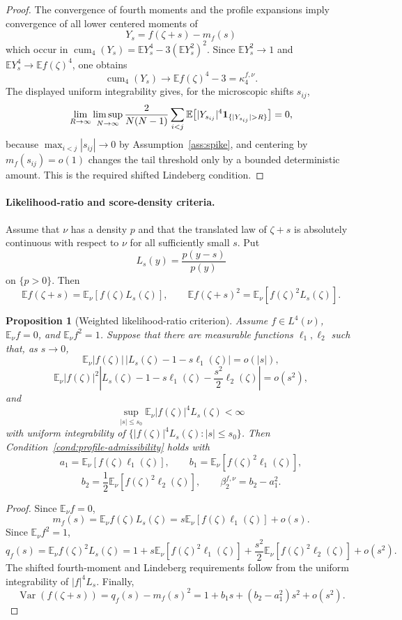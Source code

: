 \documentclass[11pt]{article}
\newtheorem{proposition}[theorem]{Proposition}
\theoremstyle{definition}
\theoremstyle{remark}
\newcommand{\E}{\mathbb E}
\newcommand{\Var}{\operatorname{Var}}
\newcommand{\cum}{\operatorname{cum}}
\begin{document}
\begin{proof}
The convergence of fourth moments and the profile expansions imply convergence of all lower centered moments of
\[
        Y_s=f(\zeta+s)-m_f(s)
\]
which occur in \(\cum_4(Y_s)=\E Y_s^4-3(\E Y_s^2)^2\).  Since \(\E Y_s^2\to1\) and \(\E Y_s^4\to\E f(\zeta)^4\), one obtains
\[
        \cum_4(Y_s)\to \E f(\zeta)^4-3=\kappa_4^{f,\nu}.
\]
The displayed uniform integrability gives, for the microscopic shifts \(s_{ij}\),
\[
\lim_{R\to\infty}\limsup_{N\to\infty}
\frac{2}{N(N-1)}\sum_{i<j}
\E\bigl[|Y_{s_{ij}}|^4{\bf 1}_{\{|Y_{s_{ij}}|>R\}}\bigr]=0,
\]
because \(\max_{i<j}|s_{ij}|\to0\) by Assumption~\ref{ass:spike}, and centering by \(m_f(s_{ij})=o(1)\) changes the tail threshold only by a bounded deterministic amount.  This is the required shifted Lindeberg condition.
\end{proof}


\paragraph{Likelihood-ratio and score-density criteria.}

Assume that \(\nu\) has a density \(p\) and that the translated law of \(\zeta+s\) is absolutely continuous with respect to \(\nu\) for all sufficiently small \(s\).  Put
\[
        L_s(y)=\frac{p(y-s)}{p(y)}
\]
on \(\{p>0\}\).  Then
\[
        \E f(\zeta+s)=\E_\nu[f(\zeta)L_s(\zeta)],\qquad
        \E f(\zeta+s)^2=\E_\nu[f(\zeta)^2L_s(\zeta)].
\]

\begin{proposition}[Weighted likelihood-ratio criterion]
\label{prop:likelihood-W}
Assume \(f\in L^4(\nu)\), \(\E_\nu f=0\), and
\(\E_\nu f^2=1\).  Suppose that there are measurable functions
\(\ell_1,\ell_2\) such that, as \(s\to0\),
\[
        \E_\nu |f(\zeta)|\,|L_s(\zeta)-1-s\ell_1(\zeta)|=o(|s|),
\]
\[
        \E_\nu |f(\zeta)|^2\left|L_s(\zeta)-1-s\ell_1(\zeta)-\frac{s^2}{2}\ell_2(\zeta)\right|=o(s^2),
\]
and
\[
        \sup_{|s|\le s_0}\E_\nu |f(\zeta)|^4L_s(\zeta)<\infty
\]
with uniform integrability of \(\{|f(\zeta)|^4L_s(\zeta): |s|\le s_0\}\).  Then Condition~\ref{cond:profile-admissibility} holds with
\[
        a_1=\E_\nu[f(\zeta)\ell_1(\zeta)],\qquad
        b_1=\E_\nu[f(\zeta)^2\ell_1(\zeta)],
\]
\[
        b_2=\frac12\E_\nu[f(\zeta)^2\ell_2(\zeta)],\qquad
        \beta_2^{f,\nu}=b_2-a_1^2.
\]
\end{proposition}

\begin{proof}
Since \(\E_\nu f=0\),
\[
        m_f(s)=\E_\nu f(\zeta)L_s(\zeta)=s\E_\nu[f(\zeta)\ell_1(\zeta)]+o(s).
\]
Since \(\E_\nu f^2=1\),
\[
        q_f(s)=\E_\nu f(\zeta)^2L_s(\zeta)
        =1+s\E_\nu[f(\zeta)^2\ell_1(\zeta)]+\frac{s^2}{2}\E_\nu[f(\zeta)^2\ell_2(\zeta)]+o(s^2).
\]
The shifted fourth-moment and Lindeberg requirements follow from the uniform integrability of \(|f|^4L_s\).  Finally,
\[
        \Var(f(\zeta+s))=q_f(s)-m_f(s)^2=1+b_1s+(b_2-a_1^2)s^2+o(s^2).
\]
\end{proof}
\end{document}
